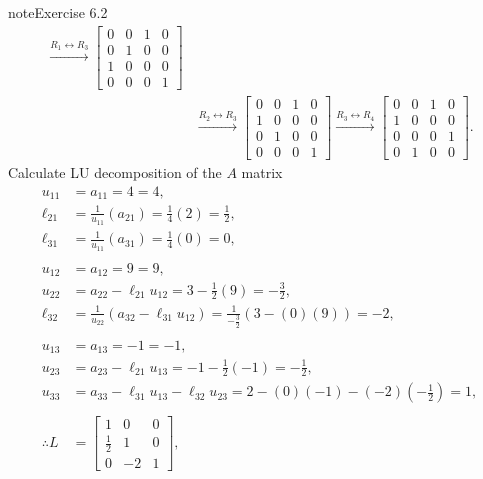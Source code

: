 \documentclass[letterpaper,10pt,english]{jupyterBook}
\begin{document}
\begin{sphinxadmonition}{note}{Exercise 6.2}
\begin{align*}
    \xrightarrow{R_{1} \leftrightarrow R_{3}}
    \left[\begin{matrix}0 & 0 & 1 & 0\\0 & 1 & 0 & 0\\1 & 0 & 0 & 0\\0 & 0 & 0 & 1\end{matrix}\right]\\
    &
    \xrightarrow{R_{2} \leftrightarrow R_{3}}
    \left[\begin{matrix}0 & 0 & 1 & 0\\1 & 0 & 0 & 0\\0 & 1 & 0 & 0\\0 & 0 & 0 & 1\end{matrix}\right]
    \xrightarrow{R_{3} \leftrightarrow R_{4}}
    \left[\begin{matrix}0 & 0 & 1 & 0\\1 & 0 & 0 & 0\\0 & 0 & 0 & 1\\0 & 1 & 0 & 0\end{matrix}\right]
.
\end{align*}
\sphinxAtStartPar
Calculate LU decomposition of the \(A\) matrix
\begin{align*}
    u_{11} &= a_{11} = 4 = 4, \\
    \ell_{21} &= \frac{1}{u_{11}}\left(a_{21}\right) = \frac{1}{4}\left(2\right) = \frac{1}{2}, \\
    \ell_{31} &= \frac{1}{u_{11}}\left(a_{31}\right) = \frac{1}{4}\left(0\right) = 0, \\
    \\
    u_{12} &= a_{12} = 9 = 9, \\
    u_{22} &= a_{22} - \ell_{21} u_{12} = 3 - \frac{1}{2}\left(9\right) = - \frac{3}{2}, \\
    \ell_{32} &= \frac{1}{u_{22}}\left(a_{32} - \ell_{31} u_{12}\right) = \frac{1}{- \frac{3}{2}}\left(3 - \left(0\right)\left(9\right)\right) = -2, \\
    \\
    u_{13} &= a_{13} = -1 = -1, \\
    u_{23} &= a_{23} - \ell_{21} u_{13} = -1 - \frac{1}{2}\left(-1\right) = - \frac{1}{2}, \\
    u_{33} &= a_{33} - \ell_{31} u_{13} - \ell_{32} u_{23} = 2 - \left(0\right)\left(-1\right) - \left(-2\right)\left(- \frac{1}{2}\right) = 1, \\
    \\
    \therefore L &= \left[\begin{matrix}1 & 0 & 0\\\frac{1}{2} & 1 & 0\\0 & -2 & 1\end{matrix}\right], \qquad

\end{align*}
\end{sphinxadmonition}
\end{document}
